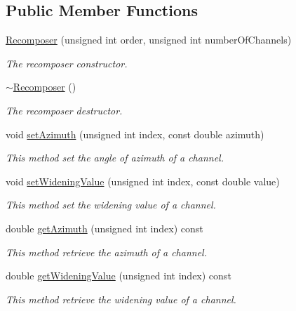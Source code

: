\subsection*{Public Member Functions}
\begin{DoxyCompactItemize}
\item 
\hyperlink{class_hoa2_d_1_1_recomposer_aa5feded7afd2329099583b245d276140}{Recomposer} (unsigned int order, unsigned int number\-Of\-Channels)
\begin{DoxyCompactList}\small\item\em The recomposer constructor. \end{DoxyCompactList}\item 
\hyperlink{class_hoa2_d_1_1_recomposer_a6e26043adf8b785d746084dfed82f183}{$\sim$\-Recomposer} ()
\begin{DoxyCompactList}\small\item\em The recomposer destructor. \end{DoxyCompactList}\item 
void \hyperlink{class_hoa2_d_1_1_recomposer_a2c1827fa0b25648b787077469e52a820}{set\-Azimuth} (unsigned int index, const double azimuth)
\begin{DoxyCompactList}\small\item\em This method set the angle of azimuth of a channel. \end{DoxyCompactList}\item 
void \hyperlink{class_hoa2_d_1_1_recomposer_aea7c383166c6c40c5605175b18a19ad1}{set\-Widening\-Value} (unsigned int index, const double value)
\begin{DoxyCompactList}\small\item\em This method set the widening value of a channel. \end{DoxyCompactList}\item 
double \hyperlink{class_hoa2_d_1_1_recomposer_a81bc1f97e61543558a0595f4fd8a4e46}{get\-Azimuth} (unsigned int index) const 
\begin{DoxyCompactList}\small\item\em This method retrieve the azimuth of a channel. \end{DoxyCompactList}\item 
double \hyperlink{class_hoa2_d_1_1_recomposer_a31d6045c32e191a7c5212e4e34d6d3ab}{get\-Widening\-Value} (unsigned int index) const 
\begin{DoxyCompactList}\small\item\em This method retrieve the widening value of a channel. \end{DoxyCompactList}\item 

\end{DoxyCompactItemize}
